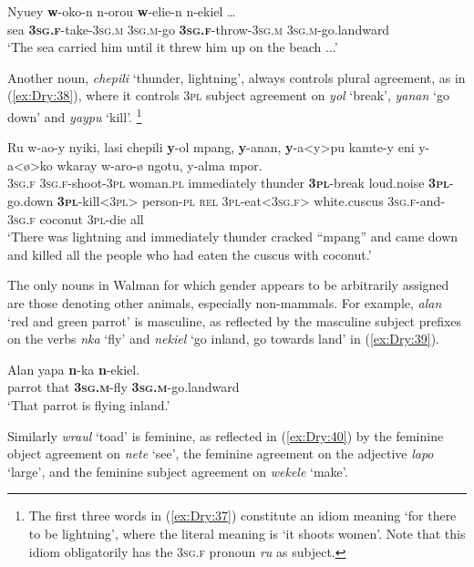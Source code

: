 \documentclass[output=collectionpaper]{langsci/langscibook}
\begin{document}
\ea \label{ex:Dry:37}
\gll Nyuey	\textbf{w}-oko-n	n-orou	\textbf{w}-elie-n {n-ekiel \ldots} \\
sea \textbf{\textsc{3sg.f}}-take-\textsc{3sg.m} \textsc{3sg.m}-go \textbf{\textsc{3sg.f}}-throw-\textsc{3sg.m} \textsc{3sg.m}-go.landward \\
\glt `The sea carried him until it threw him up on the beach ...'
\z

Another noun, \textit{chepili} `thunder, lightning', always controls plural agreement, as in (\ref{ex:Dry:38}), where it controls \textsc{3pl} subject agreement on \textit{yol} `break', \textit{yanan} `go down' and \textit{yaypu} `kill'.%
\footnote{The first three words in (\ref{ex:Dry:37}) constitute an idiom meaning `for there to be lightning', where the literal meaning is `it shoots women'. Note that this idiom obligatorily has the \textsc{3sg.f} pronoun \textit{ru} as subject.}

\ea \label{ex:Dry:38}
\gll Ru	w-ao-y	nyiki,	lasi	chepili \textbf{y}-ol	mpang,	\textbf{y}-anan,	\textbf{y}-a<y>pu kamte-y	eni	y-a<ø>ko	wkaray w-aro-ø	ngotu,	y-alma	mpor.\\
\textsc{3sg.f} \textsc{3sg.f}-shoot-\textsc{3pl} woman.\textsc{pl} immediately  thunder \textbf{\textsc{3pl}}-break loud.noise \textbf{\textsc{3pl}}-go.down \textbf{\textsc{3pl}}-kill<\textsc{3pl}>  person-\textsc{pl} \textsc{rel} \textsc{3pl}-eat<\textsc{3sg.f}> white.cuscus
\textsc{3sg.f}-and-\textsc{3sg.f} coconut \textsc{3pl}-die all\\
\glt `There was lightning and immediately thunder cracked ``mpang'' and came down and killed all the people who had eaten the cuscus with coconut.'
\z

The only nouns in Walman for which gender appears to be arbitrarily assigned are those denoting other animals, especially non-mammals. For example, \textit{alan} `red and green parrot' is masculine, as reflected by the masculine subject prefixes on the verbs \textit{nka} `fly' and \textit{nekiel} `go inland, go towards land' in (\ref{ex:Dry:39}).

\ea \label{ex:Dry:39}
\gll Alan	yapa	\textbf{n}-ka	\textbf{n}-ekiel.\\
parrot that \textbf{\textsc{3sg.m}}-fly \textbf{\textsc{3sg.m}}-go.landward\\
\glt  `That parrot is flying inland.'
\z

Similarly \textit{wraul} `toad' is feminine, as reflected in (\ref{ex:Dry:40}) by the feminine object agreement on \textit{nete} `see', the feminine agreement on the adjective \textit{lapo} `large', and the feminine subject agreement on \textit{wekele} `make'.
\end{document}
